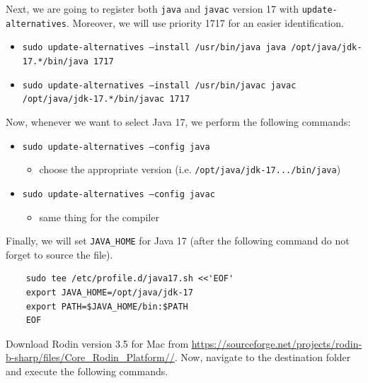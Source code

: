 \documentclass{article} %
\begin{document}
Next, we are going to register both \texttt{java} and \texttt{javac} version 17 with \texttt{update-alternatives}. Moreover, we will use priority 1717 for an easier identification.

\begin{itemize}    
    \item \texttt{sudo update-alternatives --install /usr/bin/java java /opt/java/jdk-17.*/bin/java 1717}
    \item \texttt{sudo update-alternatives --install /usr/bin/javac javac /opt/java/jdk-17.*/bin/javac 1717}
\end{itemize}

Now, whenever we want to select Java 17, we perform the following commands:

\begin{itemize}    
    \item \texttt{sudo update-alternatives --config java}
    \begin{itemize}
        \item  choose the appropriate version (i.e. \texttt{/opt/java/jdk-17.../bin/java})
    \end{itemize}
    \item \texttt{sudo update-alternatives --config javac}
    \begin{itemize}
        \item  same thing for the compiler
    \end{itemize}
\end{itemize}

Finally, we will set \texttt{JAVA\_HOME} for Java 17 (after the following command do not forget to source the file).

\begin{verbatim}
    sudo tee /etc/profile.d/java17.sh <<'EOF'
    export JAVA_HOME=/opt/java/jdk-17
    export PATH=$JAVA_HOME/bin:$PATH
    EOF
\end{verbatim}

Download Rodin version 3.5 for Mac from \href{https://sourceforge.net/projects/rodin-b-sharp/files/Core_Rodin_Platform/3.5/rodin-3.5.0.202009111309-74e0e4188-linux.gtk.x86_64.tar.gz/download} {https://\-source\-forge.\-net/\-pro\-jects/\-rodin\--b-\-sharp/\-files/\-Core\_\-Rodin\_\-Plat\-form//}. Now, navigate to the destination folder and execute the following commands.
\end{document}
